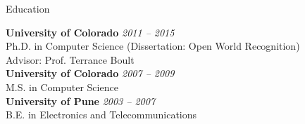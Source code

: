 \documentclass[
	10pt, %
]{resume} %
\begin{document}
%
%
%



\begin{rSection}{Education}
	
	\textbf{University of Colorado} \hfill \textit{2011 -- 2015} \\ 
	Ph.D. in Computer Science (Dissertation: Open World Recognition) \\
	Advisor: Prof. Terrance Boult \\
	\textbf{University of Colorado} \hfill \textit{2007 -- 2009} \\ 
	M.S. in Computer Science \\
	\textbf{University of Pune} \hfill \textit{2003 -- 2007} \\ 
	B.E. in Electronics and Telecommunications 
	
\end{rSection}
\end{document}
